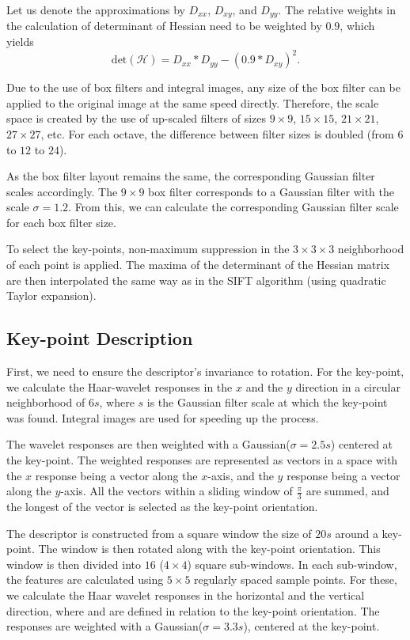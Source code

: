 Let us denote the approximations by $D_{xx}$, $D_{xy}$, and $D_{yy}$. The relative weights in the calculation of determinant of Hessian need to be weighted by $0.9$, which yields
\begin{equation}
    \text{det}(\mathcal{H}) = D_{xx} * D_{yy} - (0.9 * D_{xy})^{2}.
\end{equation}

Due to the use of box filters and integral images, any size of the box filter can be applied to the original image at the same speed directly. Therefore, the scale space is created by the use of up-scaled filters of sizes $9\times9$, $15\times15$, $21\times21$, $27\times27$, etc. For each octave, the difference between filter sizes is doubled (from $6$ to $12$ to $24$).

As the box filter layout remains the same, the corresponding Gaussian filter scales accordingly. The $9\times9$ box filter corresponds to a Gaussian filter with the scale $\sigma = 1.2$. From this, we can calculate the corresponding Gaussian filter scale for each box filter size.

To select the key-points, non-maximum suppression in the $3\times3\times3$ neighborhood of each point is applied. The maxima of the determinant of the Hessian matrix are then interpolated the same way as in the SIFT algorithm (using quadratic Taylor expansion).

\subsection{Key-point Description}
First, we need to ensure the descriptor's invariance to rotation. For the key-point, we calculate the Haar-wavelet responses in the $x$ and the $y$ direction in a circular neighborhood of $6s$, where $s$ is the Gaussian filter scale at which the key-point was found. Integral images are used for speeding up the process.

The wavelet responses are then weighted with a Gaussian($\sigma = 2.5 s$) centered at the key-point. The weighted responses are represented as vectors in a space with the $x$ response being a vector along the $x$-axis, and the $y$ response being a vector along the $y$-axis. All the vectors within a sliding window of $\frac{\pi}{3}$ are summed, and the longest of the vector is selected as the key-point orientation.

The descriptor is constructed from a square window the size of $20s$ around a key-point. The window is then rotated along with the key-point orientation. This window is then divided into $16$ ($4\times4$) square sub-windows. In each sub-window, the features are calculated using $5\times5$ regularly spaced sample points. For these, we calculate the Haar wavelet responses in the horizontal and the vertical direction, where  and  are defined in relation to the key-point orientation. The responses are weighted with a Gaussian($\sigma = 3.3s$), centered at the key-point.

